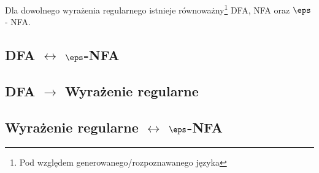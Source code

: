 Dla dowolnego wyrażenia regularnego istnieje równoważny\footnote{Pod względem generowanego/rozpoznawanego języka} DFA, NFA oraz \( \eps \) - NFA.

\subsection{DFA \texorpdfstring{\(\longleftrightarrow\)}{na} \texorpdfstring{\(\eps\)}{epsilon}-NFA}


\subsection{DFA \texorpdfstring{\( \rightarrow \)}{na} Wyrażenie regularne}


\subsection{Wyrażenie regularne \texorpdfstring{\( \longleftrightarrow \)}{na} \texorpdfstring{\(\eps\)}{epsilon}-NFA}

